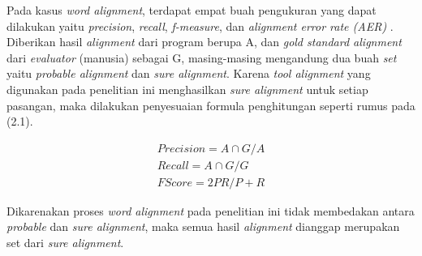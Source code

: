 Pada kasus \textit{word alignment}, terdapat empat buah pengukuran yang dapat dilakukan yaitu \textit{precision}, \textit{recall}, \textit{f-measure}, dan \textit{alignment error rate (AER)} \citep{mihalcea2003evaluation}. Diberikan hasil \textit{alignment} dari program berupa A, dan \textit{gold standard alignment} dari \textit{evaluator} (manusia) sebagai G, masing-masing mengandung dua buah \textit{set} yaitu \textit{probable alignment} dan \textit{sure alignment}. Karena \textit{tool alignment} yang digunakan pada penelitian ini menghasilkan \textit{sure alignment} untuk setiap pasangan, maka dilakukan penyesuaian formula penghitungan seperti rumus pada (2.1).

\begin{equation}
\begin{split}
Precision = A \cap G / A \\
Recall = A \cap G / G \\
FScore = 2 P R / P + R
\end{split}
\end{equation}

Dikarenakan proses \textit{word alignment} pada penelitian ini tidak membedakan antara \textit{probable} dan \textit{sure alignment}, maka semua hasil \textit{alignment} dianggap merupakan set dari \textit{sure alignment}.
